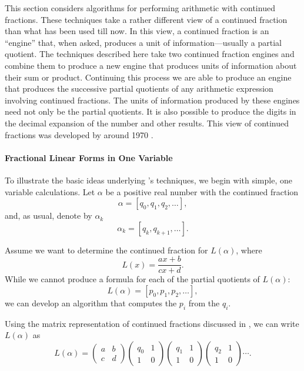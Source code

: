 This section considers algorithms for performing arithmetic with
continued fractions.  These techniques take a rather different view of
a continued fraction than what has been used till now.  In this view,
a continued fraction is an ``engine'' that, when asked, produces a
unit of information---usually a partial quotient.  The techniques
described here take two continued fraction engines and combine them to
produce a new engine that produces units of information about their
sum or product.  Continuing this process we are able to produce an
engine that produces the successive partial quotients of any
arithmetic expression involving continued fractions.  The units of
information produced by these engines need not only be the partial
quotients.  It is also possible to produce the digits in the decimal
expansion of the number and other results.  This view of continued
fractions was developed by {\Gosper} around 1970 \cite{Hakmem}.

\paragraph{Fractional Linear Forms in One Variable}

To illustrate the basic ideas underlying {\Gosper}'s techniques, we
begin with simple, one variable calculations.  Let $\alpha$ be a
positive real number with the continued fraction
\[
\alpha = [q_0, q_1, q_2, \ldots],
\]
and, as usual, denote by $\alpha_k$
\[
\alpha_k = [q_k, q_{k+1}, \ldots].
\]

Assume we want to determine the continued fraction for $L(\alpha)$, where
\begin{equation}
L(x) = \frac{ax + b}{cx + d}.
\label{BiLinear:Eq}
\end{equation}
While we cannot produce a formula for each of the partial
quotients of $L(\alpha)$:
\[L(\alpha) = [p_0, p_1, p_2, \ldots],
\]
we can develop an algorithm that computes the $p_i$ from the $q_i$.

Using the matrix representation of continued fractions discussed in
, we can write $L(\alpha)$ as
\[
L(\alpha) = \begin{pmatrix}a&b\\ c&d\end{pmatrix} \begin{pmatrix}q_0&1\\ 1&0\end{pmatrix}
\begin{pmatrix}q_1&1\\ 1&0\end{pmatrix} \begin{pmatrix}q_2&1\\ 1&0\end{pmatrix} \cdots.
\]

